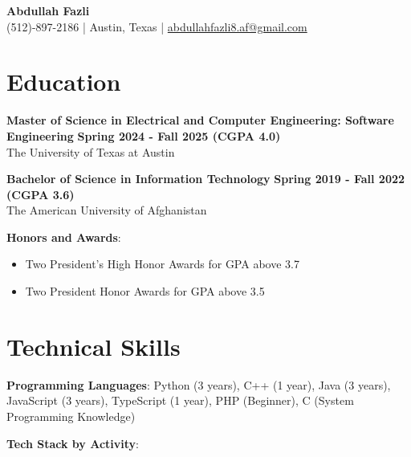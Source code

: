 \documentclass[a4paper,10pt]{article}
\begin{document}
\begin{center}
    {\LARGE \textbf{Abdullah Fazli}}\\
    (512)-897-2186 \hspace{0.5cm} | \hspace{0.5cm} Austin, Texas \hspace{0.5cm} | \hspace{0.5cm} \href{mailto:abdullahfazli8.af@gmail.com}{abdullahfazli8.af@gmail.com}
\end{center}

\vspace{-1mm}

\section{Education}
\noindent\textbf{Master of Science in Electrical and Computer Engineering: Software Engineering} \hfill \textbf{Spring 2024 - Fall 2025 (CGPA 4.0)}\\
The University of Texas at Austin

\vspace{2mm}

\noindent\textbf{Bachelor of Science in Information Technology} \hfill \textbf{Spring 2019 - Fall 2022 (CGPA 3.6)}\\
The American University of Afghanistan

\vspace{2mm}

\noindent\textbf{Honors and Awards}:
\begin{itemize}
    \item Two President’s High Honor Awards for GPA above 3.7
    \item Two President Honor Awards for GPA above 3.5
\end{itemize}

\section{Technical Skills}
\noindent\textbf{Programming Languages}: 
Python (3 years), C++ (1 year), Java (3 years), JavaScript (3 years), TypeScript (1 year), PHP (Beginner), C (System Programming Knowledge)

\vspace{2mm}

\noindent\textbf{Tech Stack by Activity}:
\end{document}
